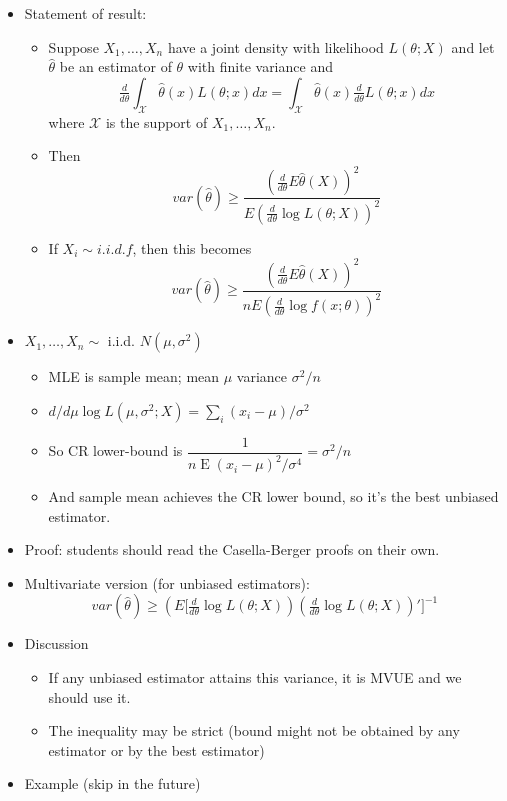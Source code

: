 \documentclass[11pt]{article}
\DeclareMathOperator{\E}{E}
\begin{document}
\begin{itemize}
\item Statement of result:
\begin{itemize}
\item Suppose $X_1,\dots,X_n$ have a joint density with likelihood
         $L(\theta; X)$ and let $\hat\theta$ be an estimator of
         $\theta$ with finite variance and \[\tfrac{d}{d\theta} \int_\mathcal{X} \hat\theta(x) L(\theta; x) dx = \int_\mathcal{X} \hat\theta(x) \tfrac{d}{d\theta} L(\theta; x) dx\]
         where $\mathcal{X}$ is the support of $X_1,\dots,X_n$.
\item Then \[var(\hat\theta) \geq \frac{(\tfrac{d}{d\theta} E \hat\theta(X))^2}{E (\tfrac{d}{d\theta} \log L(\theta; X))^2}\]
\item If $X_i \sim i.i.d. f$, then this becomes
         \[var(\hat\theta) \geq \frac{(\tfrac{d}{d\theta} E \hat\theta(X))^2}{n E (\tfrac{d}{d\theta} \log f(x; \theta))^2}\]
\end{itemize}
\item $X_1,\dots,X_n \sim$ i.i.d. $N(\mu, \sigma^2)$
\begin{itemize}
\item MLE is sample mean; mean $\mu$ variance $\sigma^2/n$
\item $d/d\mu \log L(\mu, \sigma^2; X) = \sum_i (x_i - \mu)/\sigma^2$
\item So CR lower-bound is $\dfrac{1}{n \E (x_i-\mu)^2/\sigma^4} = \sigma^2/n$
\item And sample mean achieves the CR lower bound, so it's the best
         unbiased estimator.
\end{itemize}
\item Proof: students should read the Casella-Berger proofs on their own.
\item Multivariate version (for unbiased estimators):
       \[var(\hat\theta) \geq (E \Big[\tfrac{d}{d\theta} \log L(\theta; X)) (\tfrac{d}{d\theta} \log L(\theta; X))'\Big]^{-1}\]
\item Discussion
\begin{itemize}
\item If any unbiased estimator attains this variance, it is MVUE and
         we should use it.
\item The inequality may be strict (bound might not be obtained by any estimator or by the best estimator)
\end{itemize}
\item Example (skip in the future)
\begin{itemize}

\end{itemize}
\end{itemize}
\end{document}
